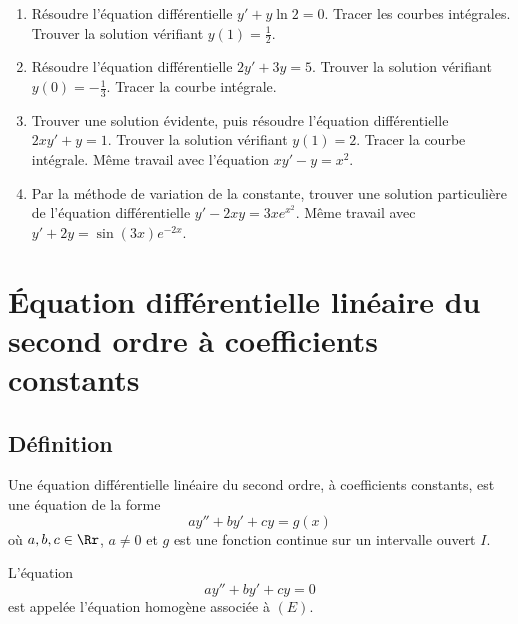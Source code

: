 \documentclass[class=report,crop=false]{standalone}
\begin{document}
\begin{miniexercices}
\sauteligne
\begin{enumerate}
  \item Résoudre l'équation différentielle $y'+ y \ln 2 = 0$.
  Tracer les courbes intégrales. Trouver la solution vérifiant $y(1)=\frac12$.

  \item Résoudre l'équation différentielle $2y'+3y=5$.
  Trouver la solution vérifiant $y(0)=-\frac13$. Tracer la courbe intégrale.

  \item Trouver une solution évidente, puis résoudre l'équation
  différentielle $2xy'+y=1$. Trouver la solution
  vérifiant $y(1)=2$. Tracer la courbe intégrale.
  Même travail avec l'équation $xy'-y=x^2$.

  \item Par la méthode de variation de la constante, trouver une solution
  particulière de l'équation différentielle $y'-2xy=3xe^{x^2}$.
  Même travail avec $y'+2y = \sin(3x)e^{-2x}$.
\end{enumerate}
\end{miniexercices}


\section{Équation différentielle linéaire du second ordre à coefficients constants}

\subsection{Définition}


Une équation différentielle linéaire du second ordre, à
 coefficients constants, est une équation de la forme
\begin{equation}
ay''+by'+cy=g(x)
\label{eq:linscd}
\tag{$E$}
\end{equation}
où $a,b,c \in \Rr$, $a \neq 0$ et $g$ est une fonction continue sur
un intervalle ouvert $I$.

L'équation
\begin{equation}
ay''+by'+cy=0
\label{eq:linscdhom}
\tag{$E_0$}
\end{equation}
est appelée l'équation homogène associée à $(E)$.
\end{document}
